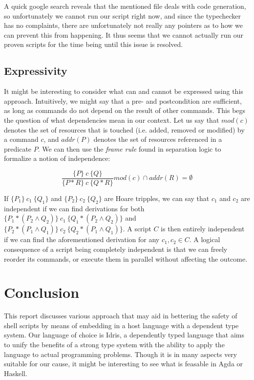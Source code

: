\documentclass[12pt,a4paper]{article}
\begin{document}
A quick google search reveals that the mentioned file deals with code generation, so unfortunately we cannot run our script right now, and since the typechecker has no complaints, there are unfortunately not really any pointers as to how we can prevent this from happening. It thus seems that we cannot actually run our proven scripts for the time being until this issue is resolved. 

\subsection{Expressivity} 

It might be interesting to consider what can and cannot be expressed using this approach. Intuitively, we might say that a pre- and postcondition are sufficient, as long as commands do not depend on the result of other commands. This begs the question of what dependencies mean in our context. Let us say that $mod(c)$ denotes the set of resources that is touched (i.e. added, removed or modified) by a command $c$, and $addr(P)$ denotes the set of resources referenced in a predicate $P$. We can then use the \textit{frame rule} found in separation logic \cite{loh14} to formalize a notion of independence: 

\begin{equation*}
\frac{\{P\}\ c\ \{Q\}}{\{P * R\}\ c\ \{Q * R\}}mod(c) \cap addr(R) = \emptyset
\end{equation*}

If $\{P_1\}\ c_1\ \{Q_1\}$ and $\{P_2\}\ c_2\ \{Q_2\}$ are Hoare tripples, we can say that $c_1$ and $c_2$ are independent if we can find derivations for both $\{P_1 * (P_2 \land Q_2)\}\ c_1\ \{Q_1 * (P_2 \land Q_2)\}$ and $\{P_2 * (P_1 \land Q_1)\}\ c_2\ \{Q_2 * (P_1 \land Q_1)\}$. A script $C$ is then entirely independent if we can find the aforementioned derivation for any $c_1, c_2 \in C$. A logical consequence of a script being completely independent is that we can freely reorder its commands, or execute them in parallel without affecting the outcome. 

\section{Conclusion}

 This report discusses various approach that may aid in bettering the safety of shell scripts by means of embedding in a host language with a dependent type system. Our language of choice is Idris, a dependently typed language that aims to unify the benefits of a strong type system with the ability to apply the language to actual programming problems. Though it is in many aspects very suitable for our cause, it might be interesting to see what is feasable in Agda or Haskell. 
\end{document}
